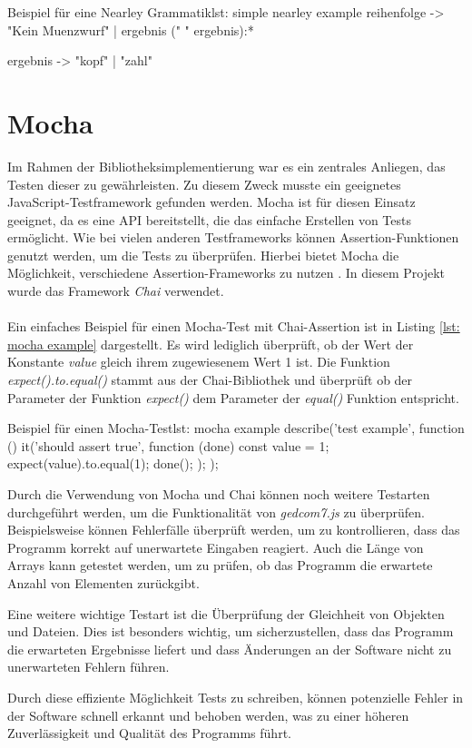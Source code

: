 {\begin{javascript}{Beispiel für eine Nearley Grammatik}{lst: simple nearley example}
	reihenfolge 
	 -> "Kein Muenzwurf" 
		| ergebnis (" " ergebnis):*
	
	ergebnis 
	 -> "kopf"
		| "zahl"
\end{javascript}}



\section{Mocha}
\label{sec: Mocha}

Im Rahmen der Bibliotheksimplementierung war es ein zentrales Anliegen, das Testen dieser zu gewährleisten.
Zu diesem Zweck musste ein geeignetes JavaScript-Testframework gefunden werden. Mocha ist für diesen Einsatz geeignet, da es eine API bereitstellt, 
die das einfache Erstellen von Tests ermöglicht. Wie bei vielen anderen Testframeworks können Assertion-Funktionen genutzt werden, um die Tests zu überprüfen. 
Hierbei bietet Mocha die Möglichkeit, verschiedene Assertion-Frameworks zu nutzen \cite{MochaDoc}. In diesem Projekt wurde das Framework \textit{Chai} verwendet.
\\\\
Ein einfaches Beispiel für einen Mocha-Test mit Chai-Assertion ist in Listing \ref{lst: mocha example} dargestellt. Es wird lediglich überprüft, ob der Wert der Konstante
\textit{value} gleich ihrem zugewiesenem Wert 1 ist.
Die Funktion \textit{expect().to.equal()} stammt aus der Chai-Bibliothek und überprüft ob der Parameter der Funktion \textit{expect()} dem Parameter der \textit{equal()} Funktion entspricht.

\begin{javascript}{Beispiel für einen Mocha-Test}{lst: mocha example}
	describe('test example', function () {
		it('should assert true', function (done) {
			const value = 1;
			expect(value).to.equal(1);
			done();
		});
	});
\end{javascript}

Durch die Verwendung von Mocha und Chai können noch weitere Testarten durchgeführt werden, um die Funktionalität 
von \textit{gedcom7.js} zu überprüfen. Beispielsweise können Fehlerfälle überprüft werden, um zu kontrollieren, 
dass das Programm korrekt auf unerwartete Eingaben reagiert. Auch die Länge von Arrays kann getestet werden, 
um zu prüfen, ob das Programm die erwartete Anzahl von Elementen zurückgibt.

Eine weitere wichtige Testart ist die Überprüfung der Gleichheit von Objekten und Dateien. Dies ist besonders 
wichtig, um sicherzustellen, dass das Programm die erwarteten Ergebnisse liefert und dass Änderungen an der 
Software nicht zu unerwarteten Fehlern führen.

Durch diese effiziente Möglichkeit Tests zu schreiben, können potenzielle Fehler in der Software schnell erkannt 
und behoben werden, was zu einer höheren Zuverlässigkeit und Qualität des Programms führt.